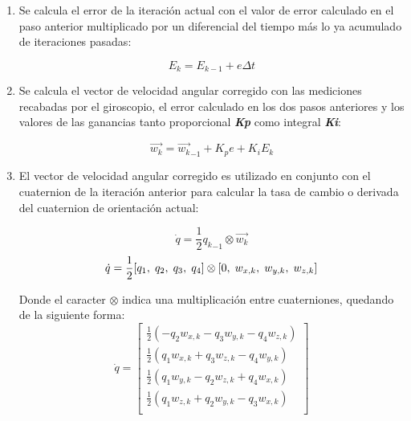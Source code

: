 \begin{enumerate}
        \item Se calcula el error de la iteración actual con el valor de error calculado en el paso anterior multiplicado por un diferencial del tiempo más lo ya acumulado de iteraciones pasadas:
 
        \begin{equation}
                E_k = E_{k-1} + e\Delta t
        \end{equation}

        \item Se calcula el vector de velocidad angular corregido con las mediciones recabadas por el giroscopio, el error calculado en los dos pasos anteriores y los valores de las ganancias tanto proporcional \textbf{\textit{Kp}} como integral \textbf{\textit{Ki}}:
        
        \begin{equation}
            \vec{w_k} = \vec{w_k}_{-1} + K_pe +K_iE_k 
        \end{equation}
            
        \item El vector de velocidad angular corregido es utilizado en conjunto con el cuaternion de la iteración anterior para calcular la tasa de cambio o derivada del cuaternion de orientación actual:
        
        \begin{equation}
            \dot{q} = \frac{1}{2}{q_k}_{-1} \otimes \vec{w_k} 
        \end{equation}
        \begin{equation}
            \dot{q} = \frac{1}{2}[q_1, \hspace{1mm} q_2, \hspace{1mm} q_3, \hspace{1mm} q_4] \otimes [0, \hspace{1mm} w_{x,k}, \hspace{1mm} w_{y,k}, \hspace{1mm} w_{z,k}] 
        \end{equation}

        Donde el caracter $ \otimes $  indica una multiplicación entre cuaterniones, quedando de la siguiente forma:
        \begin{equation}
            \dot{q} = 
                \begin{bmatrix}
                    \frac{1}{2}(-q_2w_{x,k} - q_3w_{y,k} - q_4w_{z,k}) \\
                    \frac{1}{2}( q_1w_{x,k} + q_3w_{z,k} - q_4w_{y,k}) \\
                    \frac{1}{2}( q_1w_{y,k} - q_2w_{z,k} + q_4w_{x,k}) \\
                    \frac{1}{2}( q_1w_{z,k} + q_2w_{y,k} - q_3w_{x,k}) \\
                \end{bmatrix} 
        \end{equation}    


\end{enumerate}
